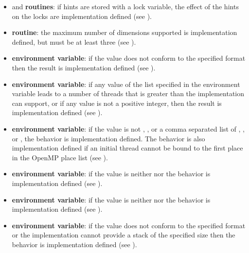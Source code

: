 \begin{itemize}
\item {} and  \textbf{routines}: 
if hints are stored with a lock variable, the effect of the hints on the locks are implementation defined (see ).

\item {} \textbf{routine}: 
  the maximum number of dimensions supported is implementation defined, but
  must be at least three (see ).

\item {} \textbf{environment variable}: if the value does not 
conform to the specified format then the result is implementation defined (see 
).

\item {} \textbf{environment variable}: if any value of the list specified in the 
 environment variable leads to a number of threads that is 
greater than the implementation can support, or if any value is not a positive integer, 
then the result is implementation defined (see ).

\item {} \textbf{environment variable}: if the value is not , , or a 
comma separated list of , , or , the behavior is 
implementation defined. The behavior is also implementation defined if an initial 
thread cannot be bound to the first place in the OpenMP place list (see 
).

\item {} \textbf{environment variable}: if the value is neither 
 nor  the behavior is implementation defined (see 
).

\item {} \textbf{environment variable}: if the value is neither 
 nor  the behavior is implementation defined (see 
).

\item {} \textbf{environment variable}: if the value does not conform to the 
specified format or the implementation cannot provide a stack of the specified size 
then the behavior is implementation defined (see ).


\end{itemize}
